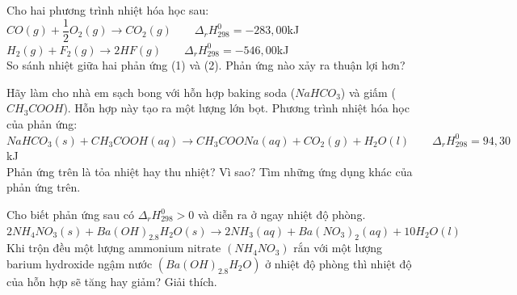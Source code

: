 \documentclass[Main.tex]{subfiles}
\begin{document}
	\begin{bt} Cho hai phương trình nhiệt hóa học sau:
		\\
		$CO(g) + \dfrac{1}{2}O_2(g) \longrightarrow CO_2(g) \qquad \Delta_r H_{298}^0 = -283{,}00$kJ
		\\
		$H_2(g) + F_2(g) \longrightarrow 2HF(g) \qquad \Delta_r H_{298}^0 = -546{,}00$kJ
		\\
		So sánh nhiệt giữa hai phản ứng (1) và (2). Phản ứng nào xảy ra thuận lợi hơn?
	\end{bt}
	\begin{bt} Hãy làm cho nhà em sạch bong với hỗn hợp baking soda ($NaHCO_3$) và giấm ($CH_3COOH$). Hỗn hợp này tạo ra một lượng lớn bọt. Phương trình nhiệt hóa học của phản ứng:
		$NaHCO_3(s) + CH_3COOH(aq) \longrightarrow CH_3COONa(aq) + CO_2(g) + H_2O(l) \qquad \Delta_r H_{298}^0 = 94{,}30$kJ
		\\
		Phản ứng trên là tỏa nhiệt hay thu nhiệt? Vì sao? Tìm những ứng dụng khác của phản ứng trên.
	\end{bt}
	
	\begin{bt}[][CD - SGK] Cho biết phản ứng sau có $\Delta_r H_{298}^0 > 0$ và diễn ra ở ngay nhiệt độ phòng.
		\\
		$2NH_4NO_3(s) + Ba(OH)_2.8H_2O(s) \longrightarrow 2NH_3(aq) + Ba(NO_3)_2(aq) + 10H_2O(l)$
		\\
		Khi trộn đều một lượng ammonium nitrate $(NH_4NO_3)$ rắn với một lượng barium hydroxide ngậm nước $(Ba(OH)_2.8H_2O)$ ở nhiệt độ phòng thì nhiệt độ của hỗn hợp sẽ tăng hay giảm? Giải thích.
	\end{bt}
	
\end{document}
